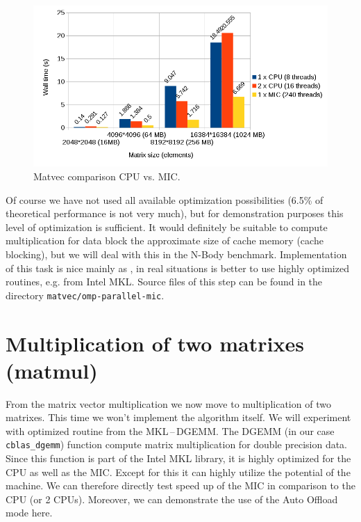 \begin{figure}[htbp]
    \centering
    \includegraphics[width=1\linewidth]{fig/matvec_xeon_vs_phi.png}
    \caption{Matvec comparison CPU vs. MIC.}
    \label{fig:graph_matvec_xeon_vs_phi}
\end{figure} 

Of course we have not used all available optimization possibilities (6.5\% of theoretical performance is not very much), but for demonstration purposes this level of optimization is sufficient. It would definitely be suitable to compute multiplication for data block the approximate size of cache memory (cache blocking), but we will deal with this in the N-Body benchmark. Implementation of this task is nice mainly as , in real situations is better to use highly optimized routines, e.g. from Intel MKL. Source files of this step can be found in the directory \texttt{matvec/omp-parallel-mic}.

\section{Multiplication of two matrixes (matmul)}
From the matrix vector multiplication we now move to multiplication of two matrixes. This time we won't implement the algorithm itself. We will experiment with optimized routine from the MKL\,--\,DGEMM. The DGEMM (in our case \texttt{cblas\_dgemm}) function compute matrix multiplication for double precision data. Since this function is part of the Intel MKL library, it is highly optimized for the CPU as well as the MIC. Except for this it can highly utilize the potential of the machine. We can therefore directly test speed up of the MIC in comparison to the CPU (or 2 CPUs). Moreover, we can demonstrate the use of the Auto Offload mode here.

